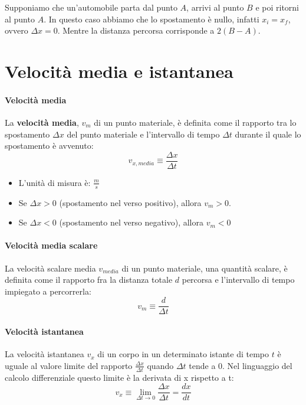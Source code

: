 \documentclass[12pt,oneside]{book}
\begin{document}
Supponiamo che un'automobile parta dal punto $A$, arrivi al punto $B$ e poi ritorni al punto $A$. In questo caso abbiamo che lo spostamento
è nullo, infatti $x_i = x_f$, ovvero $\Delta x = 0$. Mentre la distanza percorsa corrisponde a $2 (B-A)$.

\section{Velocità media e istantanea}

\paragraph{Velocità media}
La \textbf{velocità media}, $v_{m}$ di un punto materiale, è definita come il rapporto tra lo spostamento $\Delta x$ del punto materiale
e l’intervallo di tempo $\Delta t$ durante il quale lo spostamento è avvenuto:
\begin{equation*}
    v_{x,media} \equiv \frac{\Delta x}{\Delta t}
\end{equation*}

\begin{itemize}
    \item L'unità di misura è: $\frac{m}{s}$
    \item Se $\Delta x > 0$ (spostamento nel verso positivo), allora $v_m > 0$.
    \item Se $\Delta x < 0$ (spostamento nel verso negativo), allora $v_m < 0$
\end{itemize}

\paragraph{Velocità media scalare}
La velocità scalare media $v_{media}$ di un punto materiale, una quantità scalare, è definita come il rapporto
fra la distanza totale $d$ percorsa e l’intervallo di tempo impiegato a percorrerla:
\begin{equation*}
    v_{m} \equiv \frac{d}{\Delta t}
\end{equation*}

\paragraph{Velocità istantanea}
La velocità istantanea $v_x$ di un corpo in un determinato istante di tempo $t$ è uguale al valore limite del rapporto $\frac{\Delta x}{\Delta t}$
quando $\Delta t$ tende a $0$. Nel linguaggio del calcolo differenziale questo limite è la derivata di x rispetto a t:
\begin{equation*}
    v_x \equiv \lim_{\Delta t \to 0} \frac{\Delta x}{\Delta t} = \frac{dx}{dt}
\end{equation*}
\end{document}
